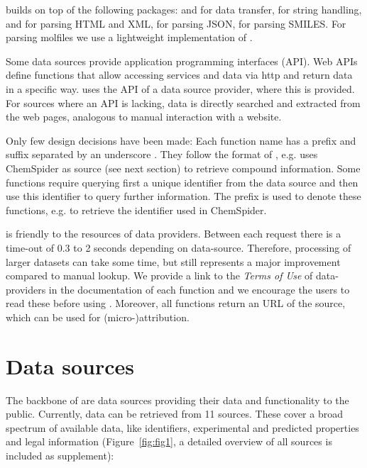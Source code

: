 \documentclass[article, shortnames]{jss}\usepackage[]{graphicx}\usepackage[]{color}
\begin{document}
 builds on top of the following  packages:
 \citep{lang_rcurl:_2015} and  \citep{wickham_httr} for data transfer,
 \citep{wickham_stringr:_2015} for string handling,
 \citep{wickham_xml2} and  \citep{wickham_rvest} for parsing HTML and XML,
 \citep{ooms_jsonlite_2014} for parsing JSON,
 \citep{guha_rcdk} for parsing SMILES.
For parsing molfiles we use a lightweight implementation of \citep{Grabner_Varmuza_Dehmer_2012}.

Some data sources provide application programming interfaces (API).
Web APIs define functions that allow accessing services and data via http and return data in a specific way.
 uses the API of a data source provider, where this is provided.
For sources where an API is lacking, data is directly searched and extracted from the web pages, analogous to manual interaction with a website.

Only few design decisions have been made:
Each function name has a prefix and suffix separated by an underscore \citep{Chamberlain_Szocs_2013}.
They follow the format of , e.g.  uses ChemSpider as source (see next section) to retrieve compound information.
Some functions require querying first a unique identifier from the data source and then use this identifier to query further information.
The prefix  is used to denote these functions, e.g.  to retrieve the identifier used in ChemSpider.

 is friendly to the resources of data providers. 
Between each request there is a time-out of 0.3 to 2 seconds depending on data-source. 
Therefore, processing of larger datasets can take some time, but still represents a major improvement compared to manual lookup.
We provide a link to the \emph{Terms of Use} of data-providers in the documentation of each function and we encourage the users to read these before using .
Moreover, all functions return an URL of the source, which can be used for \mbox{(micro-)attribution}.


\section[Data sources]{Data sources}
The backbone of  are data sources providing their data and functionality to the public.
Currently, data can be retrieved from 11 sources.
These cover a broad spectrum of available data, like identifiers, experimental and predicted properties and legal information (Figure~\ref{fig:fig1}, a detailed overview of all sources is included as supplement):
\end{document}
